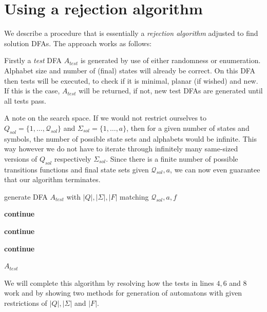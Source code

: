 \section{Using a rejection algorithm}

We describe a procedure that is essentially a \emph{rejection algorithm} adjusted to find solution DFAs. The approach works as follows:

Firstly a \emph{test} DFA $A_{test}$ is generated by use of either randomness or enumeration. Alphabet size and number of (final) states will already be correct. On this DFA then tests will be executed, to check if it is minimal, planar (if wished) and new. If this is the case, $A_{test}$ will be returned, if not, new test DFAs are generated until all tests pass.

A note on the search space. If we would not restrict ourselves to $Q_{sol} = \{1,\ldots,\mathcal{Q}_{sol}\}$ and $\Sigma_{sol} = \{1,\ldots,a\}$, then for a given number of states and symbols, the number of possible state sets and alphabets would be infinite. This way however we do not have to iterate through infinitely many same-sized versions of $Q_{sol}$ respectively $\Sigma_{sol}$. Since there is a finite number of possible transitions functions and final state sets given $\mathcal{Q}_{sol}, a$, we can now even guarantee that our algorithm terminates.

\vspace{0.2cm}
\begin{algorithmic}[1]
		
			\vspace{0.2cm}
		
			\State generate DFA $A_{test}$ with $|Q|, |\Sigma|, |F|$ matching $\mathcal{Q}_{sol}, a, f$
			
			\vspace{0.2cm}
			
				\State \textbf{continue}
			\EndIf
			
				\State \textbf{continue}
			\EndIf
			
				\State \textbf{continue}
			\EndIf
			
			\vspace{0.2cm}
			
			\State\Return $A_{test}$
		\EndWhile
	\EndFunction
\end{algorithmic}
\vspace{0.2cm}
We will complete this algorithm by resolving how the tests in lines $4, 6$ and $8$ work and by showing two methods for generation of automatons with given restrictions of $|Q|, |\Sigma|$ and $|F|$.

